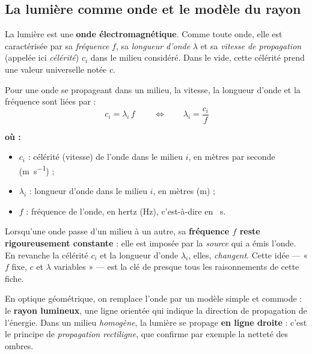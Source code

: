 \documentclass[11pt,a4paper]{article}
\newenvironment{ou}{%
  \par\smallskip\noindent\textbf{où :}\nopagebreak
  \begin{itemize}[leftmargin=1.8em,topsep=2pt,itemsep=1.5pt,parsep=0pt]}%
  {\end{itemize}}
\begin{document}
\subsection{La lumière comme onde et le modèle du rayon}

La lumière est une \textbf{onde électromagnétique}. Comme toute onde, elle est caractérisée par
sa \emph{fréquence} $f$, sa \emph{longueur d'onde} $\lambda$ et sa \emph{vitesse de propagation}
(appelée ici \emph{célérité}) $c_i$ dans le milieu considéré. Dans le vide, cette célérité prend
une valeur universelle notée $c$.

\begin{formule}
Pour une onde se propageant dans un milieu, la vitesse, la longueur d'onde et la fréquence sont liées par :
\[ \boxed{\,c_i = \lambda_i \, f\,} \qquad\Longleftrightarrow\qquad \lambda_i = \dfrac{c_i}{f} \]
\begin{ou}
  \item $c_i$ : célérité (vitesse) de l'onde dans le milieu $i$, en mètres par seconde (\si{\metre\per\second}) ;
  \item $\lambda_i$ : longueur d'onde dans le milieu $i$, en mètres (\si{\metre}) ;
  \item $f$ : fréquence de l'onde, en hertz (\si{\hertz}), c'est-à-dire en \si{\per\second}.
\end{ou}
\end{formule}

\begin{remarque}
Lorsqu'une onde passe d'un milieu à un autre, sa \textbf{fréquence $f$ reste rigoureusement constante} :
elle est imposée par la \emph{source} qui a émis l'onde. En revanche la célérité $c_i$ et la longueur
d'onde $\lambda_i$, elles, \emph{changent}. Cette idée — « $f$ fixe, $c$ et $\lambda$ variables » — est
la clé de presque tous les raisonnements de cette fiche.
\end{remarque}

En optique géométrique, on remplace l'onde par un modèle simple et commode : le \textbf{rayon lumineux},
une ligne orientée qui indique la direction de propagation de l'énergie. Dans un milieu
\emph{homogène}, la lumière se propage \textbf{en ligne droite} : c'est le principe de
\emph{propagation rectiligne}, que confirme par exemple la netteté des ombres.
\end{document}
